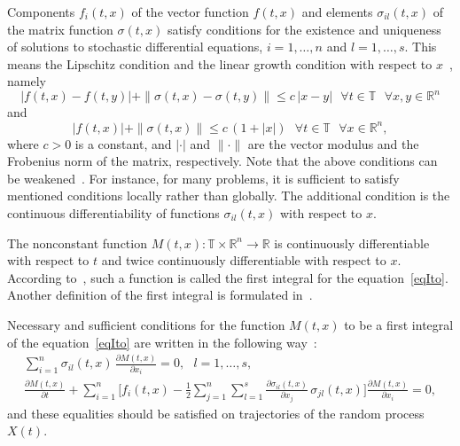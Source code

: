 \documentclass[10pt,reqno]{amsart}
\theoremstyle{plain}
\theoremstyle{remark}
\begin{document}
Components $f_i(t,x)$ of the vector function $f(t,x)$ and elements $\sigma_{il}(t,x)$ of the matrix function $\sigma(t,x)$ satisfy conditions for the existence and uniqueness of solutions to stochastic differential equations, $i = 1,\dots,n$ and $l = 1,\dots,s$. This means the Lipschitz condition and the linear growth condition with respect to $x$~\cite{Oks_13, KloPla_92}, namely
\[
  |f(t,x) - f(t,y)| + \|\sigma(t,x) - \sigma(t,y)\| \leqslant c \, |x - y| \ \ \ \forall t \in \mathds{T} \ \ \ \forall x,y \in \mathds{R}^n
\]
and
\[
  |f(t,x)| + \|\sigma(t,x)\| \leqslant c \, (1 + |x|) \ \ \ \forall t \in \mathds{T} \ \ \ \forall x \in \mathds{R}^n,
\]
where $c > 0$ is a constant, and $|\cdot|$ and $\|\cdot\|$ are the vector modulus and the Frobenius norm of the matrix, respectively. Note that the above conditions can be weakened~\cite{Khas_11, AnuVer_98}. For instance, for many problems, it is sufficient to satisfy mentioned conditions locally rather than globally. The additional condition is the continuous differentiability of functions $\sigma_{il}(t,x)$ with respect to $x$.

The nonconstant function $M(t,x) \colon \mathds{T} \times \mathds{R}^n \to \mathds{R}$ is continuously differentiable with respect to $t$ and twice continuously differentiable with respect to $x$. According to~\cite{Dub_78}, such a function is called the first integral for the equation~\eqref{eqIto}. Another definition of the first integral is formulated in~\cite{KryRoz_UMN82}.

Necessary and sufficient conditions for the function $M(t,x)$ to be a first integral of the equation~\eqref{eqIto} are written in the following way~\cite{Dub_89}:
\begin{gather}
  \sum\limits_{i=1}^n \sigma_{il}(t,x) \, \frac{\partial M(t,x)}{\partial x_i} = 0, \ \ \ l = 1,\dots,s, \label{eqCondition1} \\
  \frac{\partial M(t,x)}{\partial t} + \sum\limits_{i=1}^n \biggl[ f_i(t,x) - \frac{1}{2} \sum\limits_{j=1}^n \sum\limits_{l=1}^s \frac{\partial \sigma_{il}(t,x)}{\partial x_j} \, \sigma_{jl}(t,x) \biggr] \frac{\partial M(t,x)}{\partial x_i} = 0, \label{eqCondition2}
\end{gather}
and these equalities should be satisfied on trajectories of the random process $X(t)$.
\end{document}
